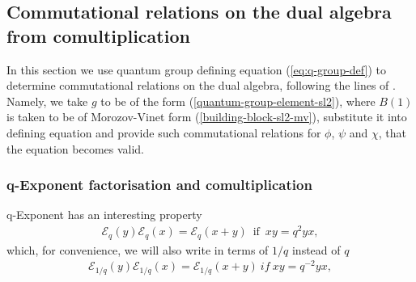\documentclass{article}
\newcommand{\lb}{\left (}
\newcommand{\rb}{\right )}
\newcommand{\lsb}{\left [}
\newcommand{\rsb}{\right ]}
\newcommand{\be}{\begin{eqnarray}}
\newcommand{\ee}{\end{eqnarray}}
\DeclareMathOperator{\If}{if}
\newcommand {\?}{\textit{???}}
\newcommand{\me}[0]{\mathcal{E}}
\def\dg{\Delta (g)}
\def\gog{g \otimes g}
\newcommand{\comul}[1]{\Delta \lb #1 \rb}
\newcommand{\delabel}[1]{(\ref{#1})}
\begin{document}

\subsection{Commutational relations on the dual algebra from comultiplication}
\label{comm-relations-dual-algebra-sl2}

In this section we use quantum group defining equation \delabel{eq:q-group-def} to determine
commutational relations on the dual algebra, following the lines of \cite{MV1}.
 Namely, we take $g$ to be of the form
\delabel{quantum-group-element-sl2}, where $B(1)$ is taken to be of Morozov-Vinet form
\delabel{building-block-sl2-mv}, substitute it into defining equation and provide
such commutational relations for $\phi$, $\psi$ and $\chi$, that the equation becomes valid.




\subsubsection{q-Exponent factorisation and comultiplication}
q-Exponent has an interesting property
\be
\me_q(y)\me_q(x) = \me_q(x + y)\ \If \ xy = q^2 yx, \label{fact_q}
\ee
which, for convenience, we will also write in terms of $1/q$ instead of $q$
\be
\me_{1/q}(y)\me_{1/q}(x) = \me_{1/q}(x + y)\ if\ xy = q^{-2} yx, \label{fact_over_q}
\ee
\end{document}
